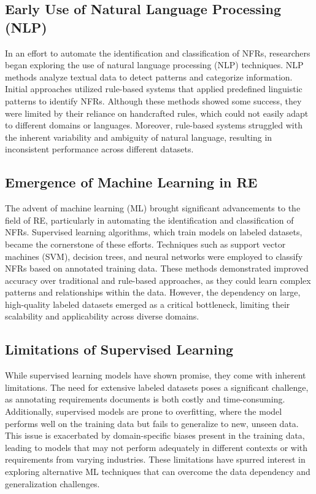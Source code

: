 \documentclass[sigconf,natbib=false]{acmart}
\begin{document}
\subsection{Early Use of Natural Language Processing (NLP)}
In an effort to automate the identification and classification of NFRs, researchers began exploring the use of natural language processing (NLP) techniques. NLP methods analyze textual data to detect patterns and categorize information. Initial approaches utilized rule-based systems that applied predefined linguistic patterns to identify NFRs. Although these methods showed some success, they were limited by their reliance on handcrafted rules, which could not easily adapt to different domains or languages. Moreover, rule-based systems struggled with the inherent variability and ambiguity of natural language, resulting in inconsistent performance across different datasets.

\subsection{Emergence of Machine Learning in RE}
The advent of machine learning (ML) brought significant advancements to the field of RE, particularly in automating the identification and classification of NFRs. Supervised learning algorithms, which train models on labeled datasets, became the cornerstone of these efforts. Techniques such as support vector machines (SVM), decision trees, and neural networks were employed to classify NFRs based on annotated training data. These methods demonstrated improved accuracy over traditional and rule-based approaches, as they could learn complex patterns and relationships within the data. However, the dependency on large, high-quality labeled datasets emerged as a critical bottleneck, limiting their scalability and applicability across diverse domains.

\subsection{Limitations of Supervised Learning}
While supervised learning models have shown promise, they come with inherent limitations. The need for extensive labeled datasets poses a significant challenge, as annotating requirements documents is both costly and time-consuming. Additionally, supervised models are prone to overfitting, where the model performs well on the training data but fails to generalize to new, unseen data. This issue is exacerbated by domain-specific biases present in the training data, leading to models that may not perform adequately in different contexts or with requirements from varying industries. These limitations have spurred interest in exploring alternative ML techniques that can overcome the data dependency and generalization challenges.
\end{document}
